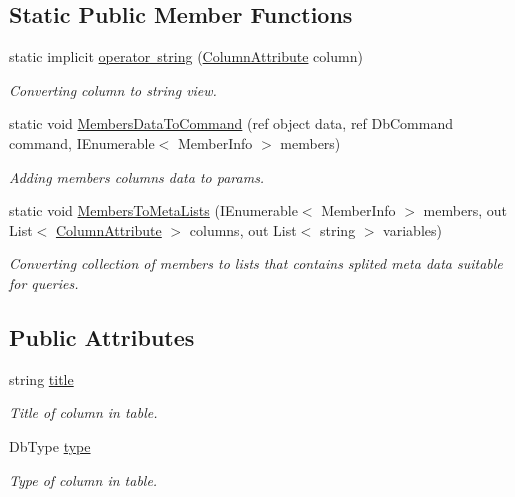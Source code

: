 \subsection*{Static Public Member Functions}
\begin{DoxyCompactItemize}
\item 
static implicit \mbox{\hyperlink{class_uniform_data_operator_1_1_sql_1_1_markup_1_1_column_attribute_a4dbbb1a9e3623b25d66ba2778b9c35d9}{operator string}} (\mbox{\hyperlink{class_uniform_data_operator_1_1_sql_1_1_markup_1_1_column_attribute}{Column\+Attribute}} column)
\begin{DoxyCompactList}\small\item\em Converting column to string view. \end{DoxyCompactList}\item 
static void \mbox{\hyperlink{class_uniform_data_operator_1_1_sql_1_1_markup_1_1_column_attribute_aace39db1b2c58ae0f181a0a6eea8b58b}{Members\+Data\+To\+Command}} (ref object data, ref Db\+Command command, I\+Enumerable$<$ Member\+Info $>$ members)
\begin{DoxyCompactList}\small\item\em Adding members columns data to params. \end{DoxyCompactList}\item 
static void \mbox{\hyperlink{class_uniform_data_operator_1_1_sql_1_1_markup_1_1_column_attribute_a08a75320f0f56cd19df66367ef876689}{Members\+To\+Meta\+Lists}} (I\+Enumerable$<$ Member\+Info $>$ members, out List$<$ \mbox{\hyperlink{class_uniform_data_operator_1_1_sql_1_1_markup_1_1_column_attribute}{Column\+Attribute}} $>$ columns, out List$<$ string $>$ variables)
\begin{DoxyCompactList}\small\item\em Converting collection of members to lists that contain\textquotesingle{}s splited meta data suitable for queries. \end{DoxyCompactList}\end{DoxyCompactItemize}
\subsection*{Public Attributes}
\begin{DoxyCompactItemize}
\item 
string \mbox{\hyperlink{class_uniform_data_operator_1_1_sql_1_1_markup_1_1_column_attribute_ab12600e7022c9c4aa36816f89e360d01}{title}}
\begin{DoxyCompactList}\small\item\em Title of column in table. \end{DoxyCompactList}\item 
Db\+Type \mbox{\hyperlink{class_uniform_data_operator_1_1_sql_1_1_markup_1_1_column_attribute_a35e345cb138b9b436a62d1d8594c8e1a}{type}}
\begin{DoxyCompactList}\small\item\em Type of column in table. \end{DoxyCompactList}\end{DoxyCompactItemize}


